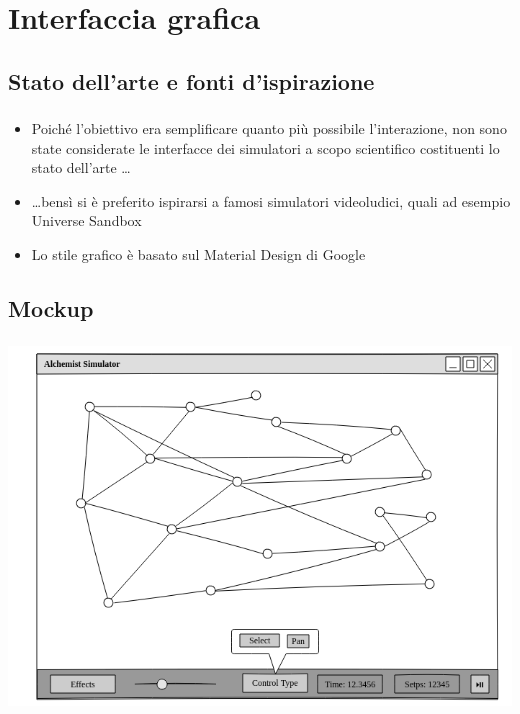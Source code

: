 \documentclass[%
]{beamer}
\begin{document}
    \section{Interfaccia grafica}\label{sec:mockup}
        \subsection{Stato dell'arte e fonti d'ispirazione}\label{subsec:sota}
            \begin{frame}
                \frametitle{\insertsection}
                \framesubtitle{\insertsubsection}

                \begin{itemize}[<+->]
                    \item
                        Poiché l'obiettivo era semplificare quanto più possibile l'interazione, non sono state considerate le interfacce dei simulatori a scopo scientifico costituenti lo stato dell'arte \ldots
                    \item
                        \ldots bensì si è preferito ispirarsi a famosi simulatori videoludici, quali ad esempio Universe Sandbox
                    \item
                        Lo stile grafico è basato sul Material Design di Google
                \end{itemize}
            \end{frame}

        \subsection{Mockup}\label{subsec:mockup}
            \begin{frame}
                \frametitle{\insertsection}
                \framesubtitle{\insertsubsection}
                \centering
                \includegraphics[scale=0.415]{mock/withNodes/window}
            \end{frame}
\end{document}
